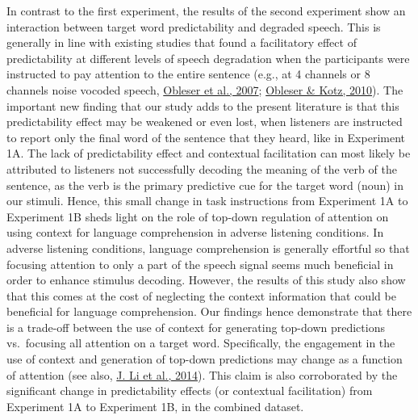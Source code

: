 \documentclass[a4paper, nobind]{templates/ociamthesis}
\begin{document}
In contrast to the first experiment, the results of the second experiment show an interaction between target word predictability and degraded speech.
This is generally in line with existing studies that found a facilitatory effect of predictability at different levels of speech degradation when the participants were instructed to pay attention to the entire sentence (e.g., at 4 channels or 8 channels noise vocoded speech, \protect\hyperlink{ref-Obleser2007}{Obleser et al., 2007}; \protect\hyperlink{ref-Obleser2010}{Obleser \& Kotz, 2010}).
The important new finding that our study adds to the present literature is that this predictability effect may be weakened or even lost, when listeners are instructed to report only the final word of the sentence that they heard, like in Experiment 1A.
The lack of predictability effect and contextual facilitation can most likely be attributed to listeners not successfully decoding the meaning of the verb of the sentence, as the verb is the primary predictive cue for the target word (noun) in our stimuli.
Hence, this small change in task instructions from Experiment 1A to Experiment 1B sheds light on the role of top-down regulation of attention on using context for language comprehension in adverse listening conditions.
In adverse listening conditions, language comprehension is generally effortful so that focusing attention to only a part of the speech signal seems much beneficial in order to enhance stimulus decoding.
However, the results of this study also show that this comes at the cost of neglecting the context information that could be beneficial for language comprehension.
Our findings hence demonstrate that there is a trade-off between the use of context for generating top-down predictions vs.~focusing all attention on a target word.
Specifically, the engagement in the use of context and generation of top-down predictions may change as a function of attention (see also, \protect\hyperlink{ref-Li2014}{J. Li et al., 2014}).
This claim is also corroborated by the significant change in predictability effects (or contextual facilitation) from Experiment 1A to Experiment 1B, in the combined dataset.
\end{document}
